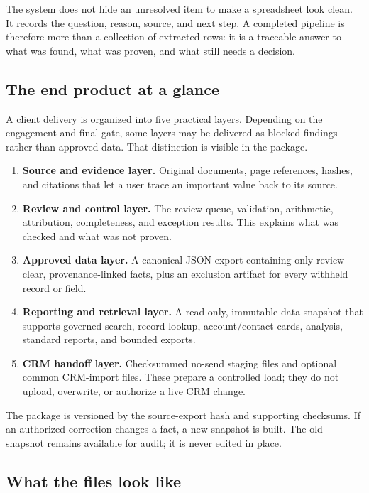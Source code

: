 \documentclass[
]{article}
\providecommand{\tightlist}{%
  \setlength{\itemsep}{0pt}\setlength{\parskip}{0pt}}
\begin{document}
The system does not hide an unresolved item to make a spreadsheet look
clean. It records the question, reason, source, and next step. A
completed pipeline is therefore more than a collection of extracted
rows: it is a traceable answer to what was found, what was proven, and
what still needs a decision.

\subsection{The end product at a
glance}\label{the-end-product-at-a-glance}

A client delivery is organized into five practical layers. Depending on
the engagement and final gate, some layers may be delivered as blocked
findings rather than approved data. That distinction is visible in the
package.

\begin{enumerate}
\def\labelenumi{\arabic{enumi}.}
\tightlist
\item
  \textbf{Source and evidence layer.} Original documents, page
  references, hashes, and citations that let a user trace an important
  value back to its source.
\item
  \textbf{Review and control layer.} The review queue, validation,
  arithmetic, attribution, completeness, and exception results. This
  explains what was checked and what was not proven.
\item
  \textbf{Approved data layer.} A canonical JSON export containing only
  review-clear, provenance-linked facts, plus an exclusion artifact for
  every withheld record or field.
\item
  \textbf{Reporting and retrieval layer.} A read-only, immutable data
  snapshot that supports governed search, record lookup, account/contact
  cards, analysis, standard reports, and bounded exports.
\item
  \textbf{CRM handoff layer.} Checksummed no-send staging files and
  optional common CRM-import files. These prepare a controlled load;
  they do not upload, overwrite, or authorize a live CRM change.
\end{enumerate}

The package is versioned by the source-export hash and supporting
checksums. If an authorized correction changes a fact, a new snapshot is
built. The old snapshot remains available for audit; it is never edited
in place.

\subsection{What the files look like}\label{what-the-files-look-like}
\end{document}
